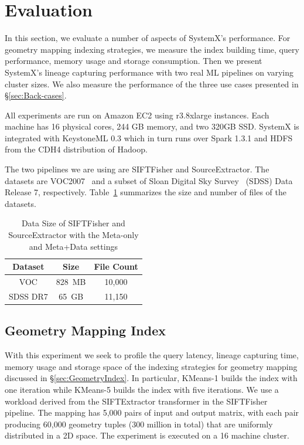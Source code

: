 \documentclass{sig-alternate}
\begin{document}
\section{Evaluation}
\label{sec:Perf}
In this section, we evaluate a number of aspects of SystemX's performance.
For geometry mapping indexing strategies, we measure the index building time, query performance, memory usage and storage consumption.
Then we present SystemX's lineage capturing performance with two real ML pipelines on varying cluster sizes.
We also measure the performance of the three use cases presented in \S\ref{sec:Back-cases}.

All experiments are run on Amazon EC2 using r3.8xlarge instances.
Each machine has 16 physical cores, 244 GB memory, and two 320GB SSD. 
SystemX is integrated with KeystoneML 0.3 which in turn runs over Spark 1.3.1 and 
HDFS from the CDH4 distribution of Hadoop. 

The two pipelines we are using are SIFTFisher and SourceExtractor. 
The datasets are VOC2007~\cite{pascal-voc-2007} and a subset of Sloan Digital Sky Survey~\cite{york00} (SDSS) Data Release 7, respectively.
Table~\ref{tb:datasets} summarizes the size and number of files of the datasets.

\begin{table}[t]
\begin{center}
    \caption{Data Size of SIFTFisher and SourceExtractor with the Meta-only and Meta+Data settings}
    \begin{scriptsize}
    \begin{tabular}{ | c | c | c | }
    \hline
    Dataset & Size & File Count \\ \hline \hline
    VOC& 828~MB &10,000  \\ \hline
    SDSS DR7 & 65~GB & 11,150 \\ \hline
    \end{tabular}
    \end{scriptsize}
    \label{tb:datasets}
\end{center}   
\end{table}

\subsection{Geometry Mapping Index}
\label{sec:Perf-Index}
With this experiment we seek to profile the query latency, lineage capturing time, memory usage and storage space 
of the indexing strategies for geometry mapping discussed in \S\ref{sec:GeometryIndex}.
In particular, KMeans-1 builds the index with one iteration while KMeans-5 builds the index with five iterations.
We use a workload derived from the SIFTExtractor transformer in the SIFTFisher pipeline. 
The mapping has 5,000 pairs of input and output matrix, with each pair producing 60,000 geometry tuples (300 million in total) that are uniformly distributed
in a 2D space. 
The experiment is executed on a 16 machine cluster.
\end{document}
